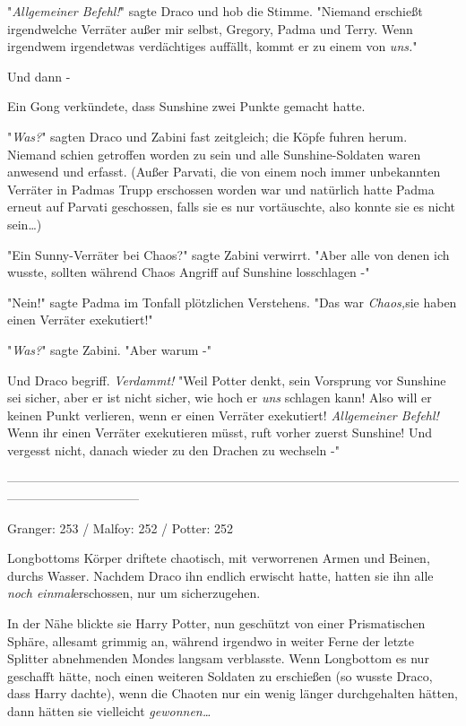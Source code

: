 {"\emph{Allgemeiner Befehl!}" sagte Draco und hob die Stimme. "Niemand erschießt irgendwelche Verräter außer mir selbst, Gregory, Padma und Terry. Wenn irgendwem irgendetwas verdächtiges auffällt, kommt er zu einem von \emph{uns.}"

Und dann -

Ein Gong verkündete, dass Sunshine zwei Punkte gemacht hatte.

"\emph{Was?}" sagten Draco und Zabini fast zeitgleich; die Köpfe fuhren herum. Niemand schien getroffen worden zu sein und alle Sunshine-Soldaten waren anwesend und erfasst. (Außer Parvati, die von einem noch immer unbekannten Verräter in Padmas Trupp erschossen worden war und natürlich hatte Padma erneut auf Parvati geschossen, falls sie es nur vortäuschte, also konnte sie es nicht sein…)

"Ein Sunny-Verräter bei Chaos?" sagte Zabini verwirrt. "Aber alle von denen ich wusste, sollten während Chaos Angriff auf Sunshine losschlagen -"

"Nein!" sagte Padma im Tonfall plötzlichen Verstehens. "Das war \emph{Chaos,}sie haben einen Verräter exekutiert!"

"\emph{Was?}" sagte Zabini. "Aber warum -"

Und Draco begriff. \emph{Verdammt!} "Weil Potter denkt, sein Vorsprung vor Sunshine sei sicher, aber er ist nicht sicher, wie hoch er \emph{uns} schlagen kann! Also will er keinen Punkt verlieren, wenn er einen Verräter exekutiert! \emph{Allgemeiner Befehl!} Wenn ihr einen Verräter exekutieren müsst, ruft vorher zuerst Sunshine! Und vergesst nicht, danach wieder zu den Drachen zu wechseln -"

--------------------------------------------------------------------------------------------------------------------------------------------

Granger: 253 / Malfoy: 252 / Potter: 252

Longbottoms Körper driftete chaotisch, mit verworrenen Armen und Beinen, durchs Wasser. Nachdem Draco ihn endlich erwischt hatte, hatten sie ihn alle \emph{noch einmal}erschossen, nur um sicherzugehen.

In der Nähe blickte sie Harry Potter, nun geschützt von einer Prismatischen Sphäre, allesamt grimmig an, während irgendwo in weiter Ferne der letzte Splitter abnehmenden Mondes langsam verblasste. Wenn Longbottom es nur geschafft hätte, noch einen weiteren Soldaten zu erschießen (so wusste Draco, dass Harry dachte), wenn die Chaoten nur ein wenig länger durchgehalten hätten, dann hätten sie vielleicht \emph{gewonnen…}

}

